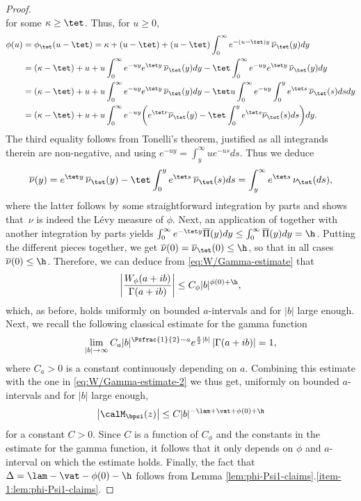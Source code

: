 \begin{proof}
\begin{equation*}
\end{equation*}
for some $\kappa \geq \tet$. Thus, for $u \geq 0$,
\begin{align*}
\phi(u) &= \phi_{\tet}(u-\tet) = \kappa+(u-\tet)+(u-\tet)\int_0^\infty e^{-(u-\tet)y}\, \overline{\nu}_{\tet}(y)dy \\
&= (\kappa-\tet) + u + u \int_0^\infty e^{-uy} e^{\tet y}\,\overline{\nu}_{\tet}(y)dy -\tet \int_0^\infty e^{-uy}e^{\tet y}\, \overline{\nu}_{\tet}(y)dy \\
&= (\kappa-\tet) + u + u \int_0^\infty e^{-uy} e^{\tet y}\,\overline{\nu}_{\tet}(y)dy -\tet u \int_0^\infty e^{-uy} \int_0^y e^{\tet s}\, \overline{\nu}_{\tet}(s)ds dy \\
&= (\kappa-\tet) + u + u \int_0^\infty e^{-uy} \biggl( e^{\tet r}\overline{\nu}_{\tet}(y) - \tet\int_0^y e^{\tet s} \overline{\nu}_{\tet}(s)ds\biggr)dy.
\end{align*}
The third equality follows from Tonelli's theorem, justified as all integrands therein are non-negative, and using $e^{-uy} = \int_y^\infty ue^{-us} ds$. Thus we deduce
\begin{equation*}
\overline{\nu}(y) = e^{\tet y}\,\overline{\nu}_\tet(y) -\tet\int_0^y e^{\tet s}\, \overline{\nu}_\tet(s)ds = \int_y^\infty e^{\tet s}\,\nu_\tet(ds),
\end{equation*}
where the latter follows by some straightforward integration by parts and shows that~$\nu$ is indeed the Lévy measure of $\phi$. Next, an application of \cite[Prop.\,4.1(9)]{Patie-Savov-GeL} together with another integration by parts yields $\int_0^\infty e^{-\tet y} \overline{\Pi}(y)dy \leq \int_0^\infty \overline{\Pi}(y)dy = \h$. Putting the different pieces together, we get $\overline{\nu}(0) = \overline{\nu}_\tet(0) \leq \h$, so that in all cases $\overline{\nu}(0) \leq \h$. Therefore, we can deduce from \eqref{eq:W/Gamma-estimate} that
\begin{equation}
\label{eq:W/Gamma-estimate-2}
\biggl| \frac{W_\phi(a+ib)}{\Gamma(a+ib)}\biggr| \leq C_\phi |b|^{\phi(0)+\h},
\end{equation}
which, as before, holds uniformly on bounded $a$-intervals and for $|b|$ large enough. Next, we recall the following classical estimate for the gamma function
\begin{equation}
\label{eq:classical-Gamma}
\lim_{|b| \to \infty} C_a|b|^{\Psfrac{1}{2}-a} e^{\frac{\pi}{2}|b|} \left|\Gamma(a+ib)\right| =1,
\end{equation}
where $C_a > 0$ is a constant continuously depending on $a$. Combining this estimate with the one in \eqref{eq:W/Gamma-estimate-2} we thus get, uniformly on bounded $a$-intervals and for $|b|$ large enough,
\begin{equation*}
\left|\calM_\bpsi(z)\right| \leq C|b|^{-\lam+\vat + \phi(0) + \h}
\end{equation*}
for a constant $C > 0$. Since $C$ is a function of $C_\phi$ and the constants in the estimate for the gamma function, it follows that it only depends on $\phi$ and $a$-interval on which the estimate holds. Finally, the fact that $\Delta = \lam-\vat-\phi(0)- \h$ follows from Lemma \ref{lem:phi-Psi1-claims}.\eqref{item-1:lem:phi-Psi1-claims}.
\end{proof}

